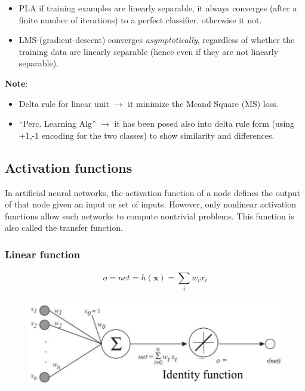 \documentclass[../main.tex]{subfiles}
\begin{document}
\begin{itemize}
    \item PLA if training examples are linearly separable, it always converges (after a finite number of iterations) to a perfect classifier, otherwise it not.
    
    \item LMS-(gradient-descent) converges \emph{asymptotically}, regardless of whether the training data are linearly separable (hence even if they are not linearly separable).

\end{itemize}

\textbf{Note}: 
\begin{itemize}
    \item Delta rule for linear unit $\rightarrow$ it minimize the Meand Square (MS) loss.
    \item “Perc. Learning Alg” $\rightarrow$ it has been posed also into delta rule form (using
+1,-1 encoding for the two classes) to show similarity and differences.
\end{itemize}
\newpage

\subsection{Activation functions}
In artificial neural networks, the activation function of a node defines the output of that node given an input or set of inputs. However, only nonlinear activation functions allow such networks to compute nontrivial problems. This function is also called the transfer function.
\subsubsection{Linear function}
    $$ o = net = h(\mathbf{x}) = \sum_{i}^{} w_ix_i$$
    \begin{figure}[H]
        \centering
        \includegraphics[scale = 0.3]{lectures/4_neural_networks/4_activation_function_linear_act.png}
    \end{figure}
\end{document}
